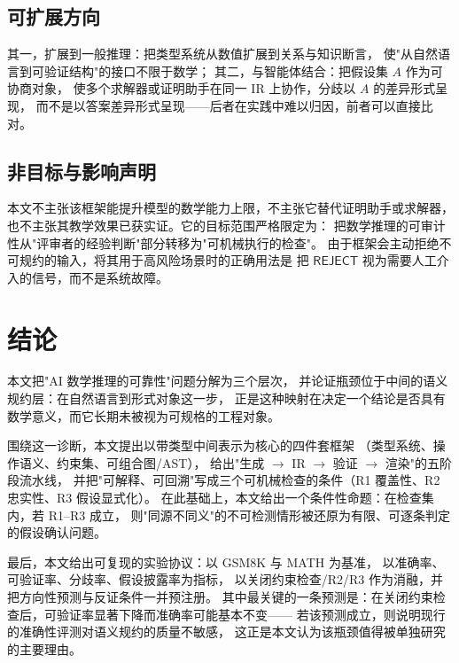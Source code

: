 \documentclass[11pt]{article}
\begin{document}
\subsection{可扩展方向}
其一，扩展到一般推理：把类型系统从数值扩展到关系与知识断言，
使"从自然语言到可验证结构"的接口不限于数学；
其二，与智能体结合：把假设集 $A$ 作为可协商对象，
使多个求解器或证明助手在同一 IR 上协作，分歧以 $A$ 的差异形式呈现，
而不是以答案差异形式呈现——后者在实践中难以归因，前者可以直接比对。

\subsection{非目标与影响声明}
本文不主张该框架能提升模型的数学能力上限，不主张它替代证明助手或求解器，
也不主张其教学效果已获实证。它的目标范围严格限定为：
把数学推理的可审计性从"评审者的经验判断"部分转移为"可机械执行的检查"。
由于框架会主动拒绝不可规约的输入，将其用于高风险场景时的正确用法是
把 $\mathsf{REJECT}$ 视为需要人工介入的信号，而不是系统故障。

\section{结论}
\label{sec:conclusion}
本文把"AI 数学推理的可靠性"问题分解为三个层次，
并论证瓶颈位于中间的语义规约层：在自然语言到形式对象这一步，
正是这种映射在决定一个结论是否具有数学意义，而它长期未被视为可规格的工程对象。

围绕这一诊断，本文提出以带类型中间表示为核心的四件套框架
（类型系统、操作语义、约束集、可组合图/AST），
给出"生成 $\to$ IR $\to$ 验证 $\to$ 渲染"的五阶段流水线，
并把"可解释、可回溯"写成三个可机械检查的条件（R1 覆盖性、R2 忠实性、R3 假设显式化）。
在此基础上，本文给出一个条件性命题：在检查集内，若 R1--R3 成立，
则"同源不同义"的不可检测情形被还原为有限、可逐条判定的假设确认问题。

最后，本文给出可复现的实验协议：以 GSM8K 与 MATH 为基准，
以准确率、可验证率、分歧率、假设披露率为指标，
以关闭约束检查/R2/R3 作为消融，并把方向性预测与反证条件一并预注册。
其中最关键的一条预测是：在关闭约束检查后，可验证率显著下降而准确率可能基本不变——
若该预测成立，则说明现行的准确性评测对语义规约的质量不敏感，
这正是本文认为该瓶颈值得被单独研究的主要理由。


\end{document}
